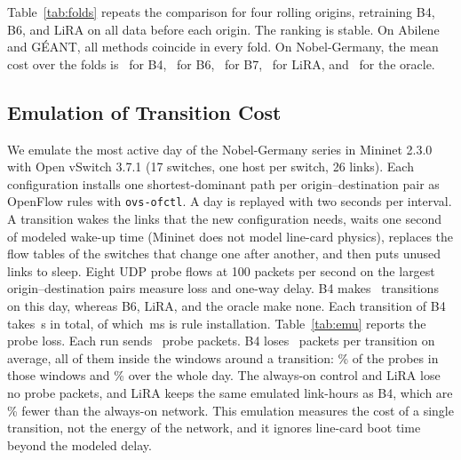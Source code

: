 \documentclass[journal]{IEEEtran}
\begin{document}
Table~\ref{tab:folds} repeats the comparison for four rolling origins, retraining B4, B6, and LiRA on all data before each origin. The ranking is stable. On Abilene and G\'{E}ANT, all methods coincide in every fold. On Nobel-Germany, the mean cost over the folds is \foldNobBFour\ for B4, \foldNobBSix\ for B6, \foldNobBSeven\ for B7, \foldNobLiRA\ for LiRA, and \foldNobO\ for the oracle.

\begin{table}[t]
\centering
\caption{Rolling-Origin Folds (Mean over Four Folds, Default Price)}
\label{tab:folds}
\footnotesize
\setlength{\tabcolsep}{3pt}

\end{table}

\subsection{Emulation of Transition Cost}\label{sec:res-emu}

We emulate the most active day of the Nobel-Germany series in Mininet 2.3.0 with Open vSwitch 3.7.1 (17 switches, one host per switch, 26 links). Each configuration installs one shortest-dominant path per origin--destination pair as OpenFlow rules with \texttt{ovs-ofctl}. A day is replayed with two seconds per interval. A transition wakes the links that the new configuration needs, waits one second of modeled wake-up time (Mininet does not model line-card physics), replaces the flow tables of the switches that change one after another, and then puts unused links to sleep. Eight UDP probe flows at 100 packets per second on the largest origin--destination pairs measure loss and one-way delay. B4 makes \emuTrans\ transitions on this day, whereas B6, LiRA, and the oracle make none. Each transition of B4 takes \emuTransS\,s in total, of which \emuRuleMs\,ms is rule installation. Table~\ref{tab:emu} reports the probe loss. Each run sends \emuProbePkts\ probe packets. B4 loses \emuLostPerTrans\ packets per transition on average, all of them inside the windows around a transition: \emuLossWin\% of the probes in those windows and \emuLossAll\% over the whole day. The always-on control and LiRA lose no probe packets, and LiRA keeps the same emulated link-hours as B4, which are \emuLinkSave\% fewer than the always-on network. This emulation measures the cost of a single transition, not the energy of the network, and it ignores line-card boot time beyond the modeled delay.

\begin{table}[t]
\centering
\caption{Mininet Emulation of the Most Active Day of Nobel-Germany. Loss in Windows Counts Probes Sent from 0.2\,s Before a Transition Starts to 1\,s After It Ends. Link-Hours Are the Emulated Active Link Time}
\label{tab:emu}
\footnotesize
\setlength{\tabcolsep}{4pt}

\end{table}
\end{document}
